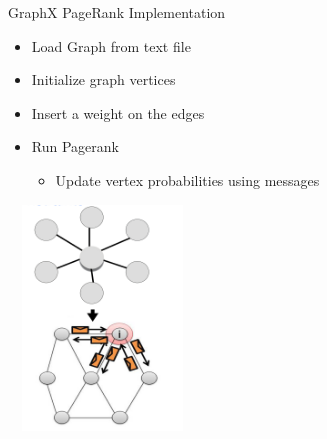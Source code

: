 \documentclass{beamer}
\begin{document}
\begin{frame}{GraphX PageRank Implementation}
    \begin{minipage}{6cm}
    \begin{itemize}
        \item{Load Graph from text file}
        \item{Initialize graph vertices}
        \item{Insert a weight on the edges}
        \item{Run Pagerank}
        \begin{itemize}
            \item{Update vertex probabilities using messages}
        \end{itemize}
    \end{itemize}
    \end{minipage}%
    \begin{minipage}{5cm}
        \includegraphics[height=6cm, width=5cm]{graphXPageRank.png}
    \end{minipage}

\end{frame}
\end{document}
